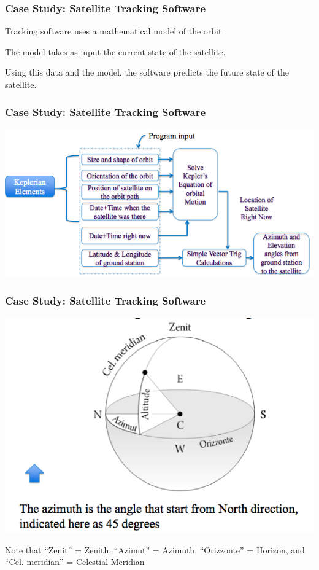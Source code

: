 \begin{frame}
	\frametitle{Case Study: Satellite Tracking Software}
	
	\begin{changemargin}{1cm}
	Tracking software uses a \alert{mathematical model} of the orbit.
	
	The model takes as input the \alert{current state} of the satellite.
	
	Using this data and the model, the software predicts the \alert{future state} of the satellite.
	
    \end{changemargin}
\end{frame}


\begin{frame}
	\frametitle{Case Study: Satellite Tracking Software}
	
	\begin{center}
	\includegraphics[width=1.25\textheight]{images/casestudysw.png}
	\end{center}
    
\end{frame}

\begin{frame}
	\frametitle{Case Study: Satellite Tracking Software}
	
\begin{center}
	\includegraphics[width=\textheight]{images/azimuth.png}
\end{center}

{\small Note that ``Zenit'' = Zenith, ``Azimut'' = Azimuth, ``Orizzonte'' = Horizon, and ``Cel. meridian'' = Celestial Meridian}
    
\end{frame}



